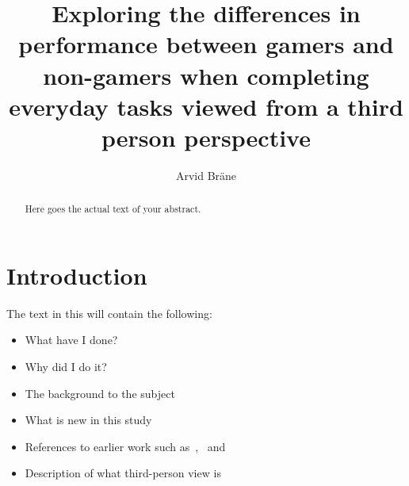 \documentclass[runningheads,a4paper,oribibl]{llncs}
\begin{document}
\pagestyle{headings}

\mainmatter

\title{Exploring the differences in performance between gamers and non-gamers when completing everyday tasks viewed from a third person perspective}



\author{Arvid Bräne}


\maketitle


\begin{abstract}
	Here goes the actual text of your abstract.
\end{abstract}














\section{Introduction}
The text in this will contain the following:
\begin{itemize}
	\item What have I done?
	\item Why did I do it?
	\item The background to the subject
	\item What is new in this study
	\item References to earlier work such as~\cite{schmierbach2011exploring},~\cite{salamin2006benefits} and~\cite{nakamura20103pi}
	\item Description of what third-person view is
\end{itemize}
\end{document}
